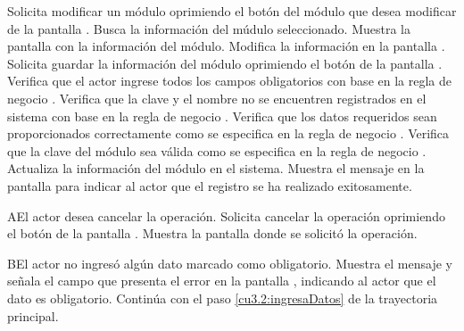  \begin{UCtrayectoria}
    \UCpaso[\UCactor] Solicita modificar un módulo oprimiendo el botón \btnEditar del módulo que desea modificar de la pantalla .
    \UCpaso[\UCsist] Busca la información del múdulo seleccionado.
    \UCpaso[\UCsist] Muestra la pantalla  con la información del módulo. 
    \UCpaso[\UCactor] Modifica la información en la pantalla . \label{cu3.2:ingresaDatos}
    \UCpaso[\UCactor] Solicita guardar la información del módulo oprimiendo el botón  de la pantalla .  
    \UCpaso[\UCsist] Verifica que el actor ingrese todos los campos obligatorios con base en la regla de negocio . 
    \UCpaso[\UCsist] Verifica que la clave y el nombre no se encuentren registrados en el sistema con base en la regla de negocio  . 
    \UCpaso[\UCsist] Verifica que los datos requeridos sean proporcionados correctamente como se especifica en la regla de negocio .  
    \UCpaso[\UCsist] Verifica que la clave del módulo sea válida como se especifica en la regla de negocio . 
    \UCpaso[\UCsist] Actualiza la información del módulo en el sistema.
    \UCpaso[\UCsist] Muestra el mensaje  en la pantalla 
    para indicar al actor que el registro se ha realizado exitosamente. 
 \end{UCtrayectoria}
 \begin{UCtrayectoriaA}{A}{El actor desea cancelar la operación.}
    \UCpaso[\UCactor] Solicita cancelar la operación oprimiendo el botón  de la pantalla .
    \UCpaso[\UCsist] Muestra la pantalla donde se solicitó la operación.
 \end{UCtrayectoriaA} 
 \begin{UCtrayectoriaA}{B}{El actor no ingresó algún dato marcado como obligatorio.}
    \UCpaso[\UCsist] Muestra el mensaje  y señala el campo que presenta el error en la pantalla 
	    , indicando al actor que el dato es obligatorio.
    \UCpaso[] Continúa con el paso \ref{cu3.2:ingresaDatos} de la trayectoria principal.
 \end{UCtrayectoriaA}
